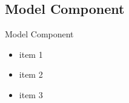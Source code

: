 \subsection{Model Component}
\begin{frame}{Model Component}
	\begin{itemize}
		\item item 1
		\item item 2
		\item item 3
	\end{itemize}
\end{frame}
